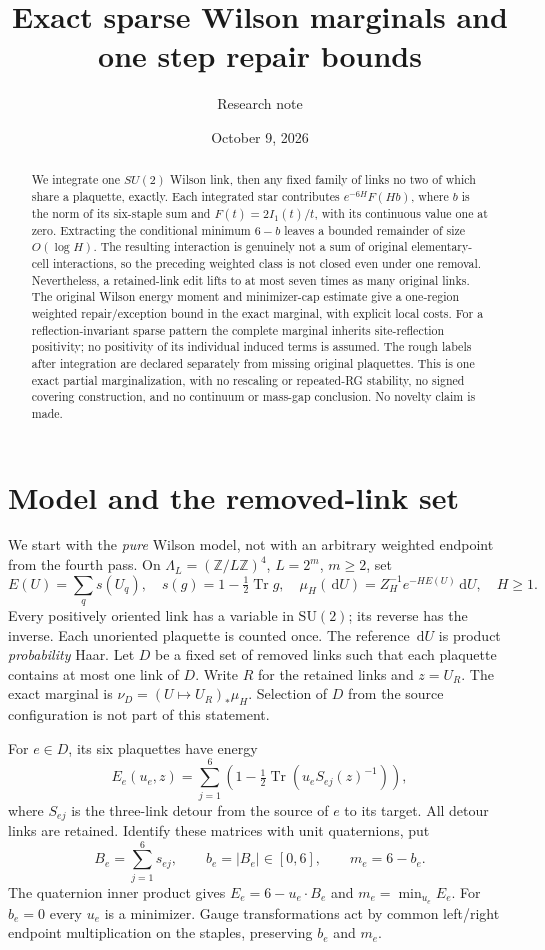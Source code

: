 \documentclass[11pt]{article}
\title{Exact sparse Wilson marginals and one step repair bounds}
\author{Research note}
\date{October 9, 2026}
\theoremstyle{definition}
\theoremstyle{remark}
\newcommand{\dd}{\,\mathrm d}
\newcommand{\Tr}{\operatorname{Tr}}
\newcommand{\SU}{\mathrm{SU}(2)}
\begin{document}
\maketitle
\begin{abstract}
We integrate one $SU(2)$ Wilson link, then any fixed family of links no
two of which share a plaquette, exactly. Each integrated star contributes
$e^{-6H}F(Hb)$, where $b$ is the norm of its six-staple sum and
$F(t)=2I_1(t)/t$, with its continuous value one at zero. Extracting the
conditional minimum $6-b$ leaves a bounded remainder of size $O(\log H)$.
The resulting interaction is genuinely not a sum of original
elementary-cell interactions, so the preceding weighted class is not
closed even under one removal. Nevertheless, a retained-link edit lifts
to at most seven times as many original links. The original Wilson
energy moment and minimizer-cap estimate give a one-region weighted
repair/exception bound in the exact marginal, with explicit local costs.
For a reflection-invariant sparse pattern the complete marginal inherits
site-reflection positivity; no positivity of its individual induced terms
is assumed. The rough labels after integration are declared separately
from missing original plaquettes. This is one exact partial
marginalization, with no rescaling or repeated-RG stability, no signed
covering construction, and no continuum or mass-gap conclusion. No
novelty claim is made.
\end{abstract}
\tableofcontents

\section{Model and the removed-link set}
We start with the \emph{pure} Wilson model, not with an arbitrary weighted
endpoint from the fourth pass. On
$\Lambda_L=(\mathbb Z/L\mathbb Z)^4$, $L=2^m$, $m\ge2$, set
\[
 E(U)=\sum_qs(U_q),\quad s(g)=1-\tfrac12\Tr g,
 \quad\mu_H(\dd U)=Z_H^{-1}e^{-HE(U)}\dd U,\quad H\ge1.
\]
Every positively oriented link has a variable in $\SU$; its reverse has
the inverse. Each unoriented plaquette is counted once. The reference
$\dd U$ is product \emph{probability} Haar. Let $D$ be a fixed set of
removed links such that each plaquette contains at most one link of $D$.
Write $R$ for the retained links and $z=U_R$. The exact marginal is
$\nu_D=(U\mapsto U_R)_*\mu_H$. Selection of $D$ from the source
configuration is not part of this statement.

For $e\in D$, its six plaquettes have energy
\[
 E_e(u_e,z)=\sum_{j=1}^6\left(1-\tfrac12\Tr(u_eS_{ej}(z)^{-1})\right),
\]
where $S_{ej}$ is the three-link detour from the source of $e$ to its
target. All detour links are retained. Identify these matrices with unit
quaternions, put
\begin{equation}
 B_e=\sum_{j=1}^6s_{ej},\qquad b_e=|B_e|\in[0,6],\qquad m_e=6-b_e.
 \label{eq:staples}
\end{equation}
The quaternion inner product gives $E_e=6-u_e\cdot B_e$ and
$m_e=\min_{u_e}E_e$. For $b_e=0$ every $u_e$ is a minimizer. Gauge
transformations act by common left/right endpoint multiplication on the
staples, preserving $b_e$ and $m_e$.
\end{document}

